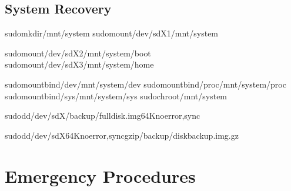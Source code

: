 \documentclass[letterpaper,10pt,english]{sphinxmanual}
\begin{document}
\subsection{System Recovery}
\label{\detokenize{troubleshooting:system-recovery}}
\sphinxAtStartPar
{}

\begin{sphinxVerbatim}[commandchars=\\\{\}]
sudomkdir/mnt/system
sudomount/dev/sdX1/mnt/system

sudomount/dev/sdX2/mnt/system/boot
sudomount/dev/sdX3/mnt/system/home

sudomount\PYGZhy{}\PYGZhy{}bind/dev/mnt/system/dev
sudomount\PYGZhy{}\PYGZhy{}bind/proc/mnt/system/proc
sudomount\PYGZhy{}\PYGZhy{}bind/sys/mnt/system/sys
sudochroot/mnt/system
\end{sphinxVerbatim}

\sphinxAtStartPar
{}

\begin{sphinxVerbatim}[commandchars=\\\{\}]
sudodd/dev/sdX/backup/full\PYGZhy{}disk.img64Knoerror,sync

sudodd/dev/sdX64Knoerror,syncgzip\PYGZgt{}/backup/disk\PYGZhy{}backup.img.gz
\end{sphinxVerbatim}


\section{Emergency Procedures}
\label{\detokenize{troubleshooting:emergency-procedures}}
\end{document}
